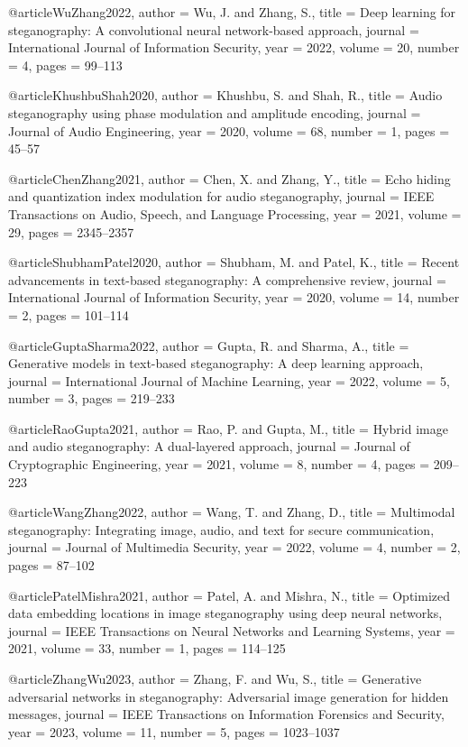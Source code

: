 \documentclass[12pt, a4paper, oneside]{book}
\begin{document}
\begin{thebibliography}{99}
@article{WuZhang2022,
  author = {Wu, J. and Zhang, S.},
  title = {Deep learning for steganography: A convolutional neural network-based approach},
  journal = {International Journal of Information Security},
  year = {2022},
  volume = {20},
  number = {4},
  pages = {99--113}
}

@article{KhushbuShah2020,
  author = {Khushbu, S. and Shah, R.},
  title = {Audio steganography using phase modulation and amplitude encoding},
  journal = {Journal of Audio Engineering},
  year = {2020},
  volume = {68},
  number = {1},
  pages = {45--57}
}

@article{ChenZhang2021,
  author = {Chen, X. and Zhang, Y.},
  title = {Echo hiding and quantization index modulation for audio steganography},
  journal = {IEEE Transactions on Audio, Speech, and Language Processing},
  year = {2021},
  volume = {29},
  pages = {2345--2357}
}

@article{ShubhamPatel2020,
  author = {Shubham, M. and Patel, K.},
  title = {Recent advancements in text-based steganography: A comprehensive review},
  journal = {International Journal of Information Security},
  year = {2020},
  volume = {14},
  number = {2},
  pages = {101--114}
}

@article{GuptaSharma2022,
  author = {Gupta, R. and Sharma, A.},
  title = {Generative models in text-based steganography: A deep learning approach},
  journal = {International Journal of Machine Learning},
  year = {2022},
  volume = {5},
  number = {3},
  pages = {219--233}
}

@article{RaoGupta2021,
  author = {Rao, P. and Gupta, M.},
  title = {Hybrid image and audio steganography: A dual-layered approach},
  journal = {Journal of Cryptographic Engineering},
  year = {2021},
  volume = {8},
  number = {4},
  pages = {209--223}
}

@article{WangZhang2022,
  author = {Wang, T. and Zhang, D.},
  title = {Multimodal steganography: Integrating image, audio, and text for secure communication},
  journal = {Journal of Multimedia Security},
  year = {2022},
  volume = {4},
  number = {2},
  pages = {87--102}
}

@article{PatelMishra2021,
  author = {Patel, A. and Mishra, N.},
  title = {Optimized data embedding locations in image steganography using deep neural networks},
  journal = {IEEE Transactions on Neural Networks and Learning Systems},
  year = {2021},
  volume = {33},
  number = {1},
  pages = {114--125}
}

@article{ZhangWu2023,
  author = {Zhang, F. and Wu, S.},
  title = {Generative adversarial networks in steganography: Adversarial image generation for hidden messages},
  journal = {IEEE Transactions on Information Forensics and Security},
  year = {2023},
  volume = {11},
  number = {5},
  pages = {1023--1037}
}


\end{thebibliography}
\end{document}

